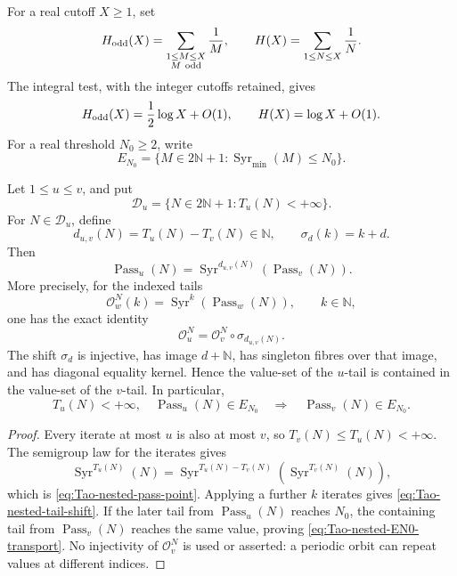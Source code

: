For a real cutoff \(X\geq1\), set
\[
 H_{\rm odd}(X)=
 \sum_{\substack{1\leq M\leq X\\M\ {\rm odd}}}\frac1M,
 \qquad
 H(X)=\sum_{1\leq N\leq X}\frac1N.
\]
The integral test, with the integer cutoffs retained, gives
\begin{equation}
\label{eq:Tao-main-harmonic-asymptotics}
 H_{\rm odd}(X)=\frac12\log X+O(1),
 \qquad H(X)=\log X+O(1).
\end{equation}
For a real threshold \(N_0\geq2\), write
\begin{equation}
\label{eq:Tao-main-EN0}
 E_{N_0}=\{M\in2\mathbb N+1:
        \operatorname{Syr}_{\min}(M)\leq N_0\}.
\end{equation}

\begin{lemma}
\label{lem:Tao-nested-passage-tail}
Let \(1\leq u\leq v\), and put
\[
 \mathcal D_u=\{N\in2\mathbb N+1:T_u(N)<+\infty\}.
\]
For \(N\in\mathcal D_u\), define
\[
 d_{u,v}(N)=T_u(N)-T_v(N)\in\mathbb N,
 \qquad \sigma_d(k)=k+d.
\]
Then
\begin{equation}
\label{eq:Tao-nested-pass-point}
 \operatorname{Pass}_u(N)
 =\operatorname{Syr}^{d_{u,v}(N)}
    (\operatorname{Pass}_v(N)).
\end{equation}
More precisely, for the indexed tails
\[
 \mathcal O_w^N(k)=
 \operatorname{Syr}^k(\operatorname{Pass}_w(N)),
 \qquad k\in\mathbb N,
\]
one has the exact identity
\begin{equation}
\label{eq:Tao-nested-tail-shift}
 \mathcal O_u^N=\mathcal O_v^N\circ\sigma_{d_{u,v}(N)}.
\end{equation}
The shift \(\sigma_d\) is injective, has image \(d+\mathbb N\), has
singleton fibres over that image, and has diagonal equality kernel.  Hence
the value-set of the \(u\)-tail is contained in the value-set of the
\(v\)-tail.  In particular,
\begin{equation}
\label{eq:Tao-nested-EN0-transport}
 T_u(N)<+\infty,\quad \operatorname{Pass}_u(N)\in E_{N_0}
 \quad\Longrightarrow\quad
 \operatorname{Pass}_v(N)\in E_{N_0}.
\end{equation}
\end{lemma}

\begin{proof}
Every iterate at most \(u\) is also at most \(v\), so
\(T_v(N)\leq T_u(N)<+\infty\).  The semigroup law for the iterates gives
\[
 \operatorname{Syr}^{T_u(N)}(N)
 =\operatorname{Syr}^{T_u(N)-T_v(N)}
   (\operatorname{Syr}^{T_v(N)}(N)),
\]
which is \eqref{eq:Tao-nested-pass-point}.  Applying a further \(k\)
iterates gives \eqref{eq:Tao-nested-tail-shift}.  If the later tail from
\(\operatorname{Pass}_u(N)\) reaches \(N_0\), the containing tail from
\(\operatorname{Pass}_v(N)\) reaches the same value, proving
\eqref{eq:Tao-nested-EN0-transport}.  No injectivity of
\(\mathcal O_v^N\) is used or asserted: a periodic orbit can repeat values
at different indices.
\end{proof}


